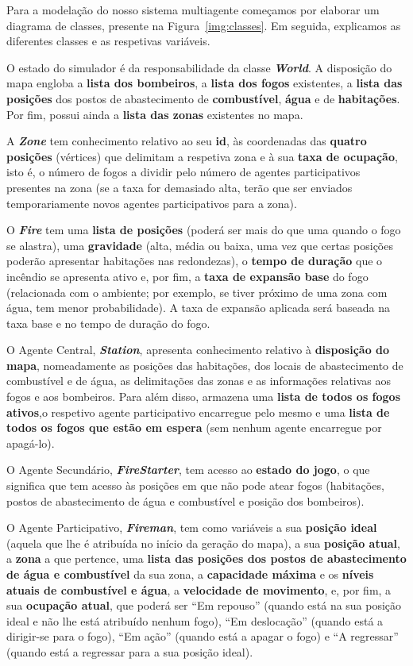 \documentclass[a4paper]{article}
\begin{document}
Para a modelação do nosso sistema multiagente começamos por elaborar um diagrama de classes, presente na Figura~\ref{img:classes}. Em seguida, explicamos as diferentes classes e as respetivas variáveis.

O estado do simulador é da responsabilidade da classe \textbf{\textit{World}}. A disposição do mapa engloba a \textbf{lista dos bombeiros}, a \textbf{lista dos fogos} existentes, a \textbf{lista das posições} dos postos de abastecimento de \textbf{combustível}, \textbf{água} e de \textbf{habitações}. Por fim, possui ainda a \textbf{lista das zonas} existentes no mapa.

A \textit{\textbf{Zone}} tem conhecimento relativo ao seu \textbf{id}, às coordenadas das \textbf{quatro posições} (vértices) que delimitam a respetiva zona e à sua \textbf{taxa de ocupação}, isto é, o número de fogos a dividir pelo número de agentes participativos presentes na zona (se a taxa for demasiado alta, terão que ser enviados temporariamente novos agentes participativos para a zona).

O \textbf{\textit{Fire}} tem uma \textbf{lista de posições} (poderá ser mais do que uma quando o fogo se alastra), uma \textbf{gravidade} (alta, média ou baixa, uma vez que certas posições poderão apresentar habitações nas redondezas), o \textbf{tempo de duração} que o incêndio se apresenta ativo e, por fim, a \textbf{taxa de expansão base} do fogo (relacionada com o ambiente; por exemplo, se tiver próximo de uma zona com água, tem menor probabilidade). A taxa de expansão aplicada será baseada na taxa base e no tempo de duração do fogo.

O Agente Central, \textbf{\textit{Station}}, apresenta conhecimento relativo à \textbf{disposição do mapa}, nomeadamente as posições das habitações, dos locais de abastecimento de combustível e de água, as delimitações das zonas e as informações relativas aos fogos e aos bombeiros. Para além disso, armazena uma \textbf{lista de todos os fogos ativos},o respetivo agente participativo encarregue pelo mesmo e uma \textbf{lista de todos os fogos que estão em espera} (sem nenhum agente encarregue por apagá-lo). 

O Agente Secundário, \textbf{\textit{FireStarter}}, tem acesso ao \textbf{estado do jogo}, o que significa que tem acesso às posições em que não pode atear fogos (habitações, postos de abastecimento de água e combustível e posição dos bombeiros).

O Agente Participativo, \textbf{\textit{Fireman}}, tem como variáveis a sua \textbf{posição ideal} (aquela que lhe é atribuída no início da geração do mapa), a sua \textbf{posição atual}, a \textbf{zona} a que pertence, uma \textbf{lista das posições dos postos de abastecimento de água e combustível} da sua zona, a \textbf{capacidade máxima} e os \textbf{níveis atuais de combustível e água}, a \textbf{velocidade de movimento}, e, por fim, a sua \textbf{ocupação atual}, que poderá ser “Em repouso” (quando está na sua posição ideal e não lhe está atribuído nenhum fogo), “Em deslocação” (quando está a dirigir-se para o fogo), “Em ação” (quando está a apagar o fogo) e “A regressar” (quando está a regressar para a sua posição ideal).
\end{document}
